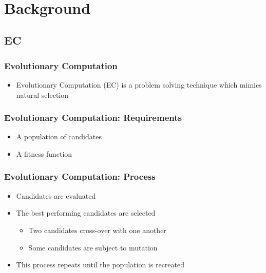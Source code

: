 \documentclass{beamer}
\begin{document}
\begin{frame}
\begin{columns}
\begin{column}{0.4\textwidth}
       \\
  \end{column}
  \end{columns}
\end{frame}


\section{Background}

\subsection{EC}
\begin{frame}
  \frametitle{Evolutionary Computation}
 \begin{itemize}
  \item Evolutionary Computation (EC) is a problem solving technique which mimics natural selection
 
   \end{itemize}
\end{frame}
	
\begin{frame}
\frametitle{Evolutionary Computation: Requirements}
\begin{itemize}
  \item A population of candidates
  \item A fitness function
\end{itemize}
\end{frame}

\begin{frame}
\frametitle{Evolutionary Computation: Process}
 \begin{itemize}
  \item Candidates are evaluated
  \item The best performing candidates are selected
 \begin{itemize}
  \item Two candidates cross-over with one another
    \item Some candidates are subject to mutation
\end{itemize}
  \item This process repeats until the population is recreated
\end{itemize}
\end{frame}
\end{document}
